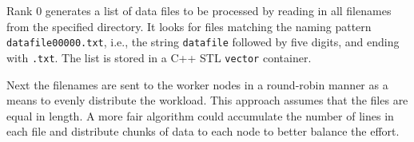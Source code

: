 Rank 0 generates a list of data files to be processed by reading in all filenames from the specified directory. It looks for files matching the naming pattern \texttt{datafile00000.txt}, i.e., the string \texttt{datafile} followed by five digits, and ending with \texttt{.txt}. The list is stored in a C++ STL \texttt{vector} container.

Next the filenames are sent to the worker nodes in a round-robin manner as a means to evenly distribute the workload. This approach assumes that the files are equal in length. A more fair algorithm could accumulate the number of lines in each file and distribute chunks of data to each node to better balance the effort.


